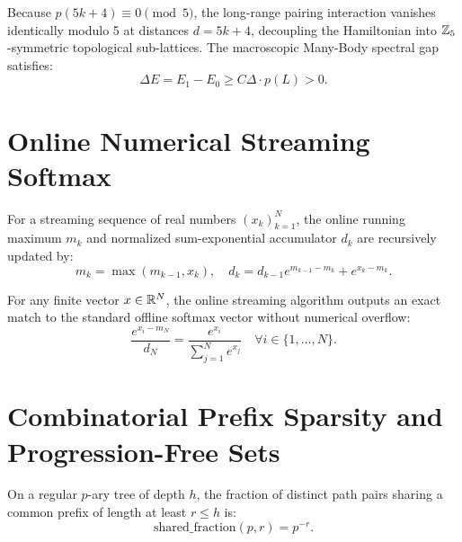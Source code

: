 \begin{theorem}
\label{thm:ramanujan_superconductor_gap}
Because $p(5k+4) \equiv 0 \pmod 5$, the long-range pairing interaction vanishes identically modulo 5 at distances $d = 5k+4$, decoupling the Hamiltonian into $\mathbb{Z}_5$-symmetric topological sub-lattices. The macroscopic Many-Body spectral gap satisfies:
\[
\Delta E = E_1 - E_0 \ge C \Delta \cdot p(L) > 0.
\]
\end{theorem}

\section{Online Numerical Streaming Softmax}

\begin{definition}
\label{def:online_softmax_step}
\leanok
For a streaming sequence of real numbers $(x_k)_{k=1}^N$, the online running maximum $m_k$ and normalized sum-exponential accumulator $d_k$ are recursively updated by:
\[
m_k = \max(m_{k-1}, x_k), \quad d_k = d_{k-1} e^{m_{k-1} - m_k} + e^{x_k - m_k}.
\]
\end{definition}

\begin{theorem}
\label{thm:online_softmax_equivalence}
\leanok
For any finite vector $x \in \mathbb{R}^N$, the online streaming algorithm outputs an exact match to the standard offline softmax vector without numerical overflow:
\[
\frac{e^{x_i - m_N}}{d_N} = \frac{e^{x_i}}{\sum_{j=1}^N e^{x_j}} \quad \forall i \in \{1, \ldots, N\}.
\]
\end{theorem}

\section{Combinatorial Prefix Sparsity and Progression-Free Sets}

\begin{definition}
\label{def:prefix_sparsity}
\leanok
On a regular $p$-ary tree of depth $h$, the fraction of distinct path pairs sharing a common prefix of length at least $r \le h$ is:
\[
\mathrm{shared\_fraction}(p, r) = p^{-r}.
\]
\end{definition}


